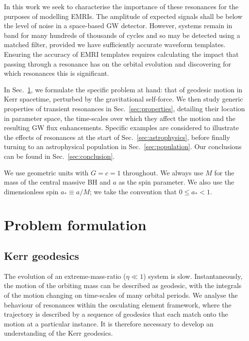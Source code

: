 \documentclass[aps,prd,amsfonts,amssymb,amsmath,nofootinbib,showpacs,superscriptaddress,twocolumn]{revtex4}
\newcommand{\secref}[1]{Sec.\ \ref{sec:#1}}
\begin{document}
In this work we seek to characterise the importance of these resonances for the purposes of modelling EMRIs. The amplitude of expected signals shall be below the level of noise in a space-based GW detector. However, systems remain in band for many hundreds of thousands of cycles and so may be detected using a matched filter, provided we have sufficiently accurate waveform templates. Ensuring the accuracy of EMRI templates requires calculating the impact that passing through a resonance has on the orbital evolution and discovering for which resonances this is significant.

In \secref{problem}, we formulate the specific problem at hand: that of geodesic motion in Kerr spacetime, perturbed by the gravitational self-force. We then study generic properties of transient resonances in \secref{properties}, detailing their location in parameter space, the time-scales over which they affect the motion and the resulting GW flux enhancements. Specific examples are considered to illustrate the effects of resonances at the start of \secref{astrophysics}, before finally turning to an astrophysical population in \secref{population}. Our conclusions can be found in \secref{conclusion}.

We use geometric units with $G = c = 1$ throughout. We always use $M$ for the mass of the central massive BH and $a$ as the spin parameter. We also use the dimensionless spin $a_\ast \equiv a/M$; we take the convention that $0 \leq a_\ast < 1$.

\section{Problem formulation}
\label{sec:problem}
\subsection{Kerr geodesics}

The evolution of an extreme-mass-ratio ($\eta \ll 1$) system is slow. Instantaneously, the motion of the orbiting mass can be described as geodesic, with the integrals of the motion changing on time-scales of many orbital periods. We analyse the behaviour of resonances within the osculating element framework, where the trajectory is described by a sequence of geodesics that each match onto the motion at a particular instance. It is therefore necessary to develop an understanding of the Kerr geodesics.
\end{document}
